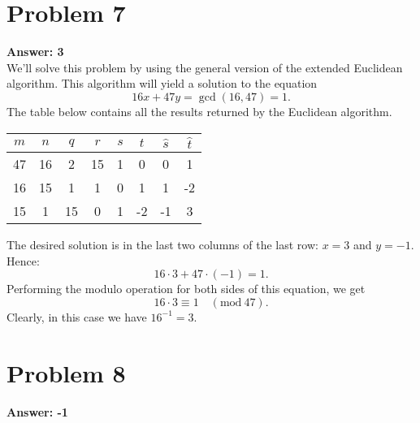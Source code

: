\documentclass[11pt]{article}
\newcommand{\Mod}{\mathrm{mod}\:}
\begin{document}
\section*{Problem 7}
\label{sec:org96a9e0e}
\textbf{Answer: 3}\\

We'll solve this problem by using the general version of the extended Euclidean
algorithm. This algorithm will yield a solution to the equation
\begin{equation}
16x+47y=\gcd(16,47)=1.
\end{equation}
The table below contains all the results returned by the Euclidean algorithm.
\begin{center}
\begin{tabular}{|c|c|c|c|c|c|c|c|}
\hline
\(m\) & \(n\) & \(q\) & \(r\) & \(s\) & \(t\) & \(\hat{s}\) & \(\hat{t}\)\\
\hline
47 & 16 & 2 & 15 & 1 & 0 & 0 & 1\\
16 & 15 & 1 & 1 & 0 & 1 & 1 & -2\\
15 & 1 & 15 & 0 & 1 & -2 & -1 & 3\\
\hline
\end{tabular}
\end{center}
The desired solution is in the last two columns of the last row: \(x=3\) and
\(y=-1\). Hence:
\begin{equation}
16\cdot 3+47\cdot(-1)=1.
\end{equation}
Performing the modulo operation for both sides of this equation, we get
\begin{equation}
16\cdot 3\equiv 1\quad(\Mod 47).
\end{equation}
Clearly, in this case we have \(16^{-1}=3\).
\section*{Problem 8}
\label{sec:org81d53da}
\textbf{Answer: -1}\\
\end{document}
